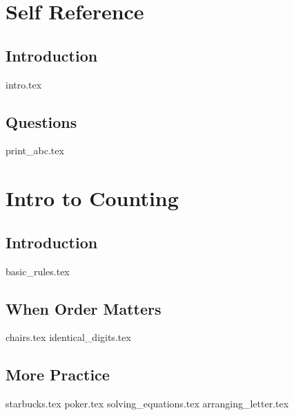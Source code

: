 \documentclass{exam}
\begin{document}
\section{Self Reference}
\subsection{Introduction}
{intro.tex}
\subsection{Questions}
\begin{questions}
{print_abc.tex}
\end{questions}

\section{Intro to Counting}
\subsection{Introduction}
{basic_rules.tex}
\subsection{When Order Matters}
\begin{questions}
{chairs.tex}
{identical_digits.tex}
\end{questions}
\subsection{More Practice}
\begin{questions}
{starbucks.tex}
{poker.tex}
{solving_equations.tex}
{arranging_letter.tex}
\end{questions}

\end{document}
